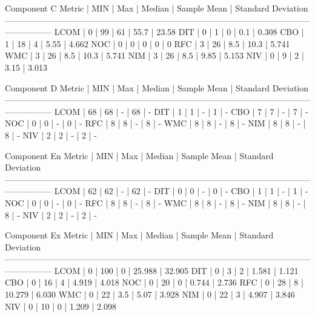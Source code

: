 Component C
Metric		|		MIN 		|		Max 		| 		Median 		| 		Sample Mean 		| 		Standard Deviation
-----------------------------------------------------------------------------------------------------------------------------
LCOM		|		0			|		99			|		61			|		55.7				|		23.58
DIT 		|		0			|		1			|		0			|		0.1					|		0.308
CBO 		|		1			|		18			|		4			|		5.55				|		4.662
NOC 		|		0			|		0			|		0			|		0					|		0
RFC 		|		3			|		26			|		8.5			|		10.3				|		5.741
WMC 		|		3			|		26			|		8.5			|		10.3				|		5.741
NIM			|		3			|		26			|		8.5			|		9.85				|		5.153
NIV 		|		0			|		9			|		2 			|		3.15				|		3.013










Component D
Metric		|		MIN 		|		Max 		| 		Median 		| 		Sample Mean 		| 		Standard Deviation
-----------------------------------------------------------------------------------------------------------------------------
LCOM		|		68			|		68			|		-			|		68					|		-
DIT 		|		1			|		1			|		-			|		1					|		-
CBO 		|		7			|		7			|		-			|		7					|		-
NOC 		|		0			|		0			|		-			|		0					|		-
RFC 		|		8			|		8			|		- 			|		8					|		-
WMC 		|		8			|		8			|		-			|		8					|		-
NIM			|		8			|		8			|		-			|		8					|		-
NIV 		|		2			|		2			|		- 			|		2					|		-






Component En
Metric		|		MIN 		|		Max 		| 		Median 		| 		Sample Mean 		| 		Standard Deviation
-----------------------------------------------------------------------------------------------------------------------------
LCOM		|		62			|		62			|		-			|		62					|		-
DIT 		|		0			|		0			|		-			|		0					|		-
CBO 		|		1			|		1			|		-			|		1					|		-
NOC 		|		0			|		0			|		-			|		0					|		-
RFC 		|		8			|		8			|		- 			|		8					|		-
WMC 		|		8			|		8			|		-			|		8					|		-
NIM			|		8			|		8			|		-			|		8					|		-
NIV 		|		2			|		2			|		- 			|		2					|		-







Component Ex
Metric		|		MIN 		|		Max 		| 		Median 		| 		Sample Mean 		| 		Standard Deviation
-----------------------------------------------------------------------------------------------------------------------------
LCOM		|		0			|		100			|		0			|		25.988				|		32.905
DIT 		|		0			|		3			|		2			|		1.581				|		1.121
CBO 		|		0			|		16			|		4			|		4.919				|		4.018
NOC 		|		0			|		20			|		0			|		0.744				|		2.736
RFC 		|		0			|		28			|		8 			|		10.279				|		6.030
WMC 		|		0			|		22			|		3.5			|		5.07				|		3.928
NIM			|		0			|		22			|		3			|		4.907				|		3.846
NIV 		|		0			|		10			|		0 			|		1.209				|		2.098







